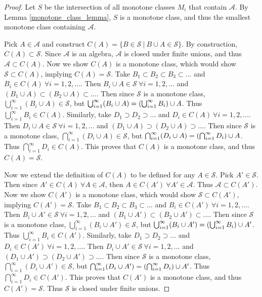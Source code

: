 \documentclass[12pt]{article}
\theoremstyle{plain}
\begin{document}
\begin{proof}
    Let $S$ be the intersection of all monotone classes $M_i$ that contain $\mathcal{A}$.  By Lemma \ref{monotone_class_lemma}, $S$ is a monotone class, and thus the smallest monotone class containing $\mathcal{A}$.

    Pick $A \in \mathcal{A}$ and construct $C(A) = \{B \in\mathcal{ S}\ |\ B \cup A \in\mathcal{ S}\}$.  By construction, $C(A) \subset\mathcal{ S}$.  Since $\mathcal{A}$ is an algebra, $\mathcal{A}$ is closed under finite unions, and thus $\mathcal{A} \subset C(A)$.  Now we show $C(A)$ is a monotone class, which would show $\mathcal{S} \subset C(A)$, implying $C(A) = \mathcal{S}$.  Take $B_1 \subset B_2 \subset B_3 \subset \dots$ and $B_i \in C(A)\ \forall i = 1, 2, \dots$.  Then $B_i \cup A \in \mathcal{S}\ \forall i = 1, 2, \dots$ and $(B_1 \cup A) \subset (B_2 \cup A) \subset \dots$.  Then since $\mathcal{S}$ is a monotone class, $\bigcup_{i=1}^\infty (B_i \cup A) \in \mathcal{S}$, but $\bigcup_{i=1}^\infty (B_i \cup A) = \qty(\bigcup_{i=1}^\infty B_i) \cup A$.  Thus $\bigcup_{i=1}^\infty B_i \in C(A)$.  Similarly, take $D_1 \supset D_2 \supset \dots$ and $D_i \in C(A)\ \forall i = 1, 2, \dots$.  Then $D_i \cup A \in \mathcal{S}\ \forall i = 1, 2, \dots$ and $(D_1 \cup A) \supset (D_2 \cup A) \supset \dots$.  Then since $\mathcal{S}$ is a monotone class, $\bigcap_{i=1}^\infty (D_i \cup A) \in \mathcal{S}$, but $\bigcap_{i=1}^\infty (D_i \cup A) = \qty(\bigcap_{i=1}^\infty D_i) \cup A$.  Thus $\bigcap_{i=1}^\infty D_i \in C(A)$.  This proves that $C(A)$ is a monotone class, and thus $C(A) = \mathcal{S}$.

    Now we extend the definition of $C(A)$ to be defined for any $A \in \mathcal{S}$.  Pick $A' \in \mathcal{S}$.  Then since $A' \in C(A)\ \forall A \in \mathcal{A}$, then $A \in C(A')\ \forall A' \in \mathcal{A}$.  Thus $\mathcal{A} \subset C(A')$.  Now we show $C(A')$ is a monotone class, which would show $\mathcal{S} \subset C(A')$, implying $C(A') = \mathcal{S}$.  Take $B_1 \subset B_2 \subset B_3 \subset \dots$ and $B_i \in C(A')\ \forall i = 1, 2, \dots$.  Then $B_i \cup A' \in \mathcal{S}\ \forall i = 1, 2, \dots$ and $(B_1 \cup A') \subset (B_2 \cup A') \subset \dots$.  Then since $\mathcal{S}$ is a monotone class, $\bigcup_{i=1}^\infty (B_i \cup A') \in \mathcal{S}$, but $\bigcup_{i=1}^\infty (B_i \cup A') = \qty(\bigcup_{i=1}^\infty B_i) \cup A'$.  Thus $\bigcup_{i=1}^\infty B_i \in C(A')$.  Similarly, take $D_1 \supset D_2 \supset \dots$ and $D_i \in C(A')\ \forall i = 1, 2, \dots$.  Then $D_i \cup A' \in \mathcal{S}\ \forall i = 1, 2, \dots$ and $(D_1 \cup A') \supset (D_2 \cup A') \supset \dots$.  Then since $\mathcal{S}$ is a monotone class, $\bigcap_{i=1}^\infty (D_i \cup A') \in \mathcal{S}$, but $\bigcap_{i=1}^\infty (D_i \cup A') = \qty(\bigcap_{i=1}^\infty D_i) \cup A'$.  Thus $\bigcap_{i=1}^\infty D_i \in C(A')$.  This proves that $C(A')$ is a monotone class, and thus $C(A') = \mathcal{S}$.  Thus $\mathcal{S}$ is closed under finite unions.


\end{proof}
\end{document}
